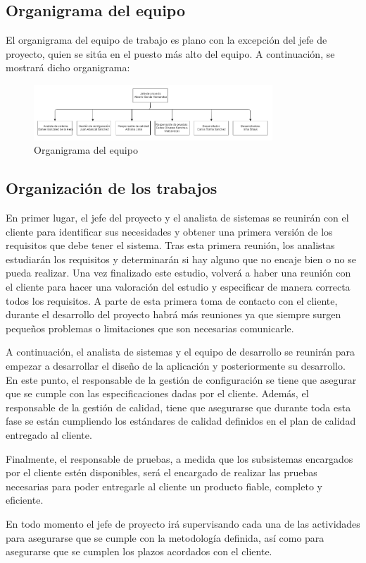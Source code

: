 \subsection {Organigrama del equipo}
\par El organigrama del equipo de trabajo es plano con la excepción del jefe de proyecto, quien se sitúa en el puesto más alto del equipo. A continuación, se mostrará dicho organigrama:

\begin{figure}[H]
\begin{center}
\includegraphics[width=0.8\textwidth]{./img/Org.png}
\end{center}
\caption{Organigrama del equipo}
\label{tab:horasTotales}
\end{figure}


\subsection {Organización de los trabajos}
\par En primer lugar, el jefe del proyecto y el analista de sistemas se reunirán con el cliente para identificar sus necesidades y obtener una primera versión de los requisitos que debe tener el sistema. Tras esta primera reunión, los analistas estudiarán los requisitos y determinarán si hay alguno que no encaje bien o no se pueda realizar. Una vez finalizado este estudio, volverá a haber una reunión con el cliente para hacer una valoración del estudio y especificar de manera correcta todos los requisitos. A parte de esta primera toma de contacto con el cliente, durante el desarrollo del proyecto habrá más reuniones ya que siempre surgen pequeños problemas o limitaciones que son necesarias comunicarle.
\par A continuación, el analista de sistemas y el equipo de desarrollo se reunirán para empezar a desarrollar el diseño de la aplicación y posteriormente su desarrollo. En este punto, el responsable de la gestión de configuración se tiene que asegurar que se cumple con las especificaciones dadas por el cliente. Además, el responsable de la gestión de calidad, tiene que asegurarse que durante toda esta fase se están cumpliendo los estándares de calidad definidos en el plan de calidad entregado al cliente.
\par Finalmente, el responsable de pruebas, a medida que los subsistemas encargados por el cliente estén disponibles, será el encargado de realizar las pruebas necesarias para poder entregarle al cliente un producto fiable, completo y eficiente.
\par En todo momento el jefe de proyecto irá supervisando cada una de las actividades para asegurarse que se cumple con la metodología definida, así como para asegurarse que se cumplen los plazos acordados con el cliente.
